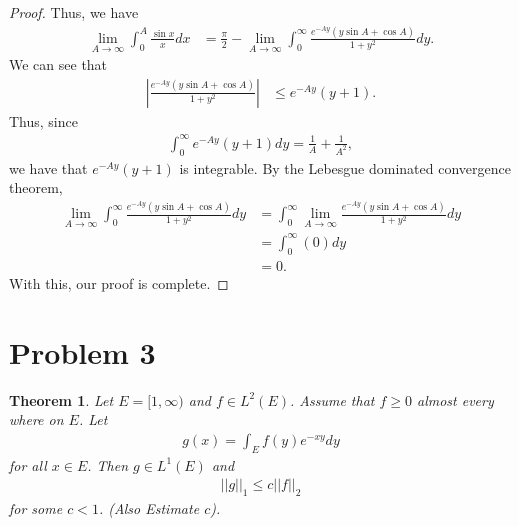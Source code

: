 \documentclass[10pt,a4paper]{article}
\theoremstyle{theorem}
\newtheorem{theorem}{Theorem}
\theoremstyle{definition}
\begin{document}
\begin{proof}
Thus, we have
\begin{align*}
\lim_{A \to \infty} \int_0^A \frac{\sin x}{x}dx &= \frac{\pi}{2} - \lim_{A \to \infty}\int_0^\infty \frac{e^{-Ay}(y \sin A + \cos A)}{1 + y^2} dy.
\end{align*}
We can see that 
\begin{align*}
\left| \frac{e^{-Ay}(y \sin A + \cos A)}{1 + y^2} \right| &\leq e^{-Ay}(y + 1).
\end{align*}
Thus, since 
\begin{align*}
\int_0^\infty e^{-Ay}(y + 1) dy = \frac{1}{A} + \frac{1}{A^2},
\end{align*}
we have that $e^{-Ay}(y + 1)$ is integrable. By the Lebesgue dominated convergence theorem,
\begin{align*}
\lim_{A \to \infty}\int_0^\infty \frac{e^{-Ay}(y \sin A + \cos A)}{1 + y^2} dy &= \int_0^\infty \lim_{A \to \infty} \frac{e^{-Ay}(y \sin A + \cos A)}{1 + y^2} dy\\
&= \int_0^\infty (0) dy\\
&= 0.
\end{align*}
With this, our proof is complete.
\end{proof}

\section*{Problem 3}
\begin{theorem}
Let $E = [1, \infty)$ and $f \in L^2(E)$. Assume that $f \geq 0$ almost every where on $E$. Let 
\begin{align*}
g(x) = \int_E f(y) e^{-xy} dy
\end{align*}
for all $x \in E$. Then $g \in L^1(E)$ and 
\begin{align*}
||g||_1 \leq c ||f||_2
\end{align*}
for some $c < 1$. (Also Estimate $c$).
\end{theorem}
\end{document}
